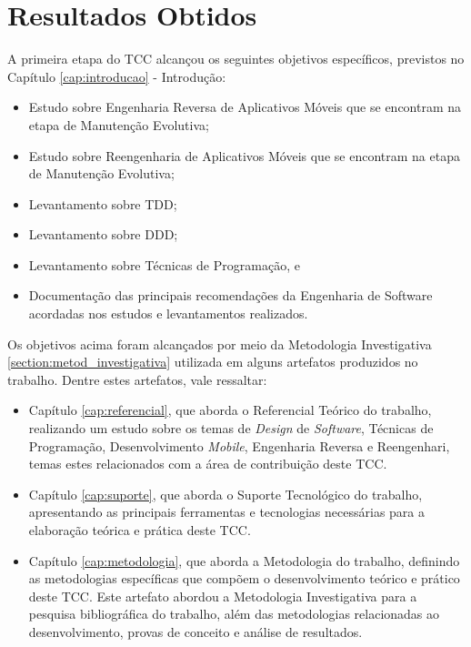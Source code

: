 \section{Resultados Obtidos}
\label{section:resultados}

A primeira etapa do TCC alcançou os seguintes objetivos específicos, previstos no Capítulo \ref{cap:introducao} - Introdução:

\begin{itemize}
  \item Estudo sobre Engenharia Reversa de Aplicativos Móveis que se encontram na etapa de Manutenção Evolutiva;
  \item Estudo sobre Reengenharia de Aplicativos Móveis que se encontram na etapa de Manutenção Evolutiva;
  \item Levantamento sobre TDD;
  \item Levantamento sobre DDD;
  \item Levantamento sobre Técnicas de Programação, e
  \item Documentação das principais recomendações da Engenharia de Software acordadas nos estudos e levantamentos realizados.
\end{itemize}

Os objetivos acima foram alcançados por meio da Metodologia Investigativa \ref{section:metod_investigativa} utilizada em 
alguns artefatos produzidos no trabalho. Dentre estes artefatos, vale ressaltar:

\begin{itemize}
  \item Capítulo \ref{cap:referencial}, que aborda o Referencial Teórico do trabalho, realizando um estudo sobre os temas de \textit{Design} de \textit{Software}, Técnicas de Programação, Desenvolvimento \textit{Mobile}, Engenharia Reversa e Reengenhari, temas estes relacionados com a área de contribuição deste TCC.
	\item Capítulo \ref{cap:suporte}, que aborda o Suporte Tecnológico do trabalho, apresentando as principais ferramentas e tecnologias necessárias para a elaboração teórica e prática deste TCC.
	\item Capítulo \ref{cap:metodologia}, que aborda a Metodologia do trabalho, definindo as metodologias específicas que compõem o desenvolvimento teórico e prático deste TCC. Este artefato abordou a Metodologia Investigativa para a pesquisa bibliográfica do trabalho, além das metodologias relacionadas ao desenvolvimento, provas de conceito e análise de resultados.
\end{itemize}


